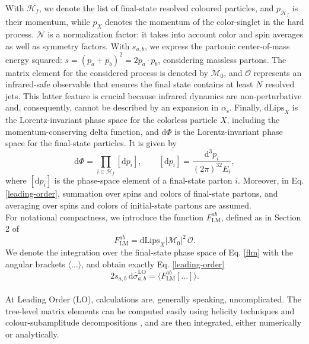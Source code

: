 \documentclass[a4paper, 12pt]{book}
\begin{document}
With $\mathcal{H}_f$, we denote the list of final-state resolved coloured particles, and $p_{\mathcal{H}_f}$ is their momentum, while $p_X$ denotes the momentum of the color-singlet in the hard process. $\mathcal{N}$ is a normalization factor: it takes into account color and spin averages as well as symmetry factors. With $s_{a,b}$, we express the partonic center-of-mass energy squared: $s=(p_a+p_b)^2=2 p_a\cdot p_b$, considering massless partons. The matrix element for the considered process is denoted by $\mathcal{M}_0$, and $\mathcal{O}$ represents an infrared-safe observable that ensures the final state contains at least $N$ resolved jets. This latter feature is crucial because infrared dynamics are non-perturbative and, consequently, cannot be described by an expansion in $\alpha_\mathrm{s}$. Finally, $\mathrm{dLips}_X$ is the Lorentz-invariant phase space for the colorless particle $X$, including the momentum-conserving delta function, and $\mathrm{d}\Phi$ is the Lorentz-invariant phase space for the final-state particles. It is given by
\begin{equation}
    \mathrm{d}\Phi= \prod_{i \in \mathcal{H}_f} [\mathrm{d}p_i], \qquad [\mathrm{d}p_i]=\frac{\mathrm{d}^3p_i}{(2\pi)^32E_i},
\end{equation}
where $[\mathrm{d}p_i]$ is the phase-space element of a final-state parton $i$. Moreover, in Eq. \ref{leading-order}, summation over spins and colors of final-state partons, and averaging over spins and colors of initial-state partons are assumed.  \\
For notational compactness, we introduce the function $F^{ab}_{\mathrm{LM}}$, defined as in Section 2 of \cite{Devoto:2023rpv}
\begin{equation}
    F^{ab}_{\mathrm{LM}} = \mathrm{dLips}_X |\mathcal{M}_0|^2 \, \mathcal{O}.
    \label{flm}
\end{equation}
We denote the integration over the final-state phase space of Eq. \ref{flm} with the angular brackets $\langle\dots\rangle$, and obtain exactly Eq. \ref{leading-order}
\begin{equation}
    2s_{a,b} \, \text{d} \hat{\sigma}_{a,b}^{\text{LO}} = \langle F^{ab}_{\mathrm{LM}}[\dots] \rangle.
\end{equation} \\
At Leading Order (LO), calculations are, generally speaking, uncomplicated. The tree-level matrix elements can be computed easily using helicity techniques and colour-subamplitude decompositions \cite{Altarelli:1977zs}, and are then integrated, either numerically or analytically. \\
\end{document}
